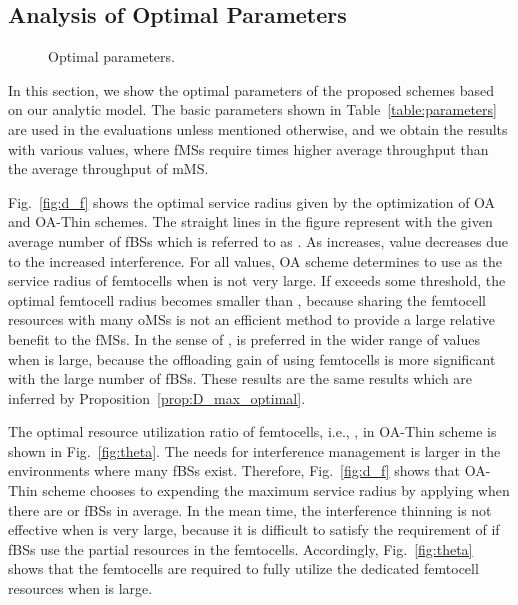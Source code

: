 \documentclass[journal]{IEEEtran}
\begin{document}
\subsection{Analysis of Optimal Parameters}
\label{sec:optimal}
\begin{figure*}
\centering {}\hfill
{}\hfill
{}
\caption{Optimal parameters.} \label{fig:optimal_parameters}
\end{figure*}


In this section, we show the optimal parameters of the proposed schemes based on our analytic model.
The basic parameters shown in Table~\ref{table:parameters} are used in the evaluations
unless mentioned otherwise, and we obtain the results with various  values, where
fMSs require  times higher average throughput than the average throughput of mMS.

Fig.~\ref{fig:d_f} shows the optimal service radius  given by
the optimization of OA and OA-Thin schemes.
The straight lines in the figure represent  with the given average number of fBSs which is referred to as .
As  increases,  value decreases due to the increased interference.
For all  values, OA scheme determines to use  as the service radius of femtocells when  is not very large.
If  exceeds some threshold, the optimal femtocell radius becomes smaller than ,
because sharing the femtocell resources with many oMSs
is not an efficient method to provide a large relative benefit to the fMSs.
In the sense of ,  is preferred in the wider range of  values when
 is large, because the offloading gain of using femtocells is more significant
with the large number of fBSs.
These results are the same results which are inferred by Proposition~\ref{prop:D_max_optimal}.

The optimal resource utilization ratio of femtocells, i.e., , in OA-Thin scheme
is shown in Fig.~\ref{fig:theta}.
The needs for interference management is larger in the environments where many fBSs exist.
Therefore, Fig.~\ref{fig:d_f} shows that OA-Thin scheme chooses to expending the maximum service radius by applying  when there are  or  fBSs in average.
In the mean time, the interference thinning is not effective
when  is very large, because it is difficult to satisfy the requirement of  if fBSs use the partial resources in the femtocells.
Accordingly, Fig.~\ref{fig:theta} shows that the femtocells are required to fully utilize the dedicated femtocell resources when  is large.
\end{document}
